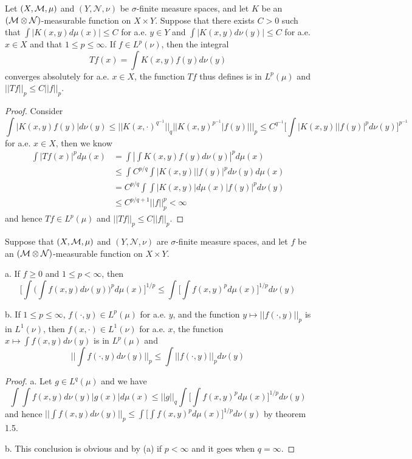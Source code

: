 \begin{theorem}
    Let $(X,\mathcal{M},\mu)$ and $(Y,\mathcal{N},\nu)$ be $\sigma$-finite measure spaces, and let $K$ be an $(\mathcal{M}\otimes\mathcal{N})$-measurable function on $X\times Y$. Suppose that there exists $C>0$ such that $\int |K(x,y)d\mu(x)| \leq C$ for a.e. $y\in Y$ and $\int|K(x,y)d\nu(y)| \leq C$ for a.e. $x\in X$ and that $1\leq p \leq \infty$. If $f\in L^p(\nu)$, then the integral
    \[Tf(x) = \int K(x,y)f(y)d\nu(y)\]
    converges absolutely for a.e. $x\in X$, the function $Tf$ thus defines is in $L^p(\mu)$ and $||Tf||_p \leq C||f||_p$.
\end{theorem}
\begin{proof}
    Consider
    \[
    \int |K(x,y)f(y)|d\nu(y) \leq ||K(x,\cdot)^{q^{-1}}||_q||K(x,y)^{p^{-1}}|f(y)|||_p \leq C^{q^{-1}}\Big[\int |K(x,y)||f(y)|^p d\nu(y)\Big]^{p^{-1}}
    \]
    for a.e. $x\in X$, then we know
    \[
    \begin{aligned}
        \int |Tf(x)|^p d\mu(x) &= \int |\int K(x,y)f(y)d\nu(y)|^p d\mu(x) \\ 
        &\leq \int C^{p/q}\int |K(x,y)||f(y)|^p d\nu(y)d\mu(x) \\ &= C^{p/q} \int \int |K(x,y)|d\mu(x)|f(y)|^p d\nu(y) \\ &\leq C^{p/q+1} ||f||_p^p <\infty
    \end{aligned}
    \]
    and hence $Tf \in L^p(\mu)$ and $||Tf||_p \leq C||f||_p$.
\end{proof}

\begin{theorem}
    Suppose that $(X,\mathcal{M},\mu)$ and $(Y,\mathcal{N},\nu)$ are $\sigma$-finite measure spaces, and let $f$ be an $(\mathcal{M}\otimes\mathcal{N})$-measurable function on $X\times Y$.\par
    a. If $f\geq 0$ and $1\leq p < \infty$, then
    \[\Big[\int\Big(\int f(x,y)d\nu(y)\Big)^p d\mu(x)\Big]^{1/p} \leq \int\Big[\int f(x,y)^pd\mu(x)\Big]^{1/p} d\nu(y)\]\par
    b. If $1\leq p \leq \infty$, $f(\cdot,y) \in L^p(\mu)$ for a.e. $y$, and the function $y\mapsto ||f(\cdot,y)||_p$ is in $L^1(\nu)$, then $f(x,\cdot) \in L^1(\nu)$ for a.e. $x$, the function $x\mapsto \int f(x,y)d\nu(y)$ is in $L^p(\mu)$ and
    \[||\int f(\cdot,y)d\nu(y)||_p \leq \int||f(\cdot,y)||_p d\nu(y)\]
\end{theorem}
\begin{proof}\par
    a. Let $g\in L^q(\mu)$ and we have
    \[
    \int \int f(x,y)d\nu(y)|g(x)| d\mu(x) \leq ||g||_q\int\Big[\int f(x,y)^p d\mu(x)\Big]^{1/p}d\nu(y)
    \]
    and hence $||\int f(x,y)d\nu(y)||_p \leq \int\Big[\int f(x,y)^p d\mu(x)\Big]^{1/p}d\nu(y)$ by theorem 1.5.\par
    b. This conclusion is obvious and by (a) if $p<\infty$ and it goes when $q = \infty$.
\end{proof}

